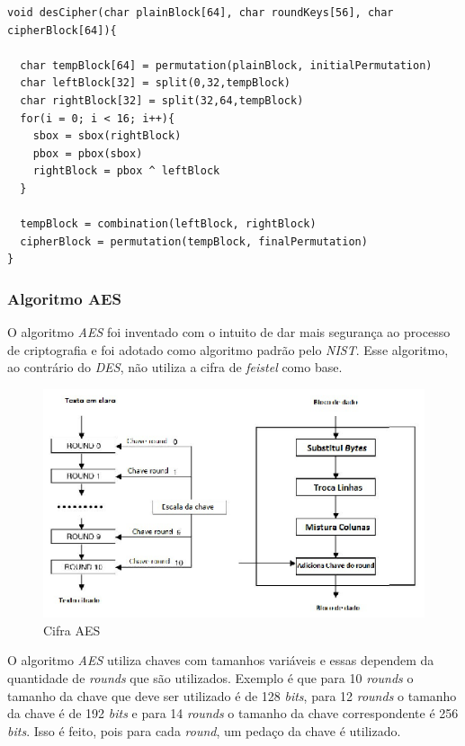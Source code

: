     \begin{lstlisting}[caption={Pseudo-código DES}, label=des-pseudo-code]
void desCipher(char plainBlock[64], char roundKeys[56], char cipherBlock[64]){

  char tempBlock[64] = permutation(plainBlock, initialPermutation)
  char leftBlock[32] = split(0,32,tempBlock)
  char rightBlock[32] = split(32,64,tempBlock)
  for(i = 0; i < 16; i++){
	sbox = sbox(rightBlock)  
	pbox = pbox(sbox)
	rightBlock = pbox ^ leftBlock
  }
  
  tempBlock = combination(leftBlock, rightBlock)
  cipherBlock = permutation(tempBlock, finalPermutation)
}
    \end{lstlisting}


\subsubsection{Algoritmo AES}

O algoritmo \textit{AES} foi inventado com o intuito de dar mais segurança ao processo de criptografia e foi adotado como algoritmo padrão pelo \textit{NIST}. Esse algoritmo, ao contrário do \textit{DES}, não utiliza a cifra de \textit{feistel} como base. 

\begin{figure}[h]
	\centering
	\includegraphics[scale=2]
		{figuras/aes_cipher.eps}
		\caption[Cifra\textit{AES}]{Cifra AES\protect\footnotemark} 
		\label{cifra-aes}
\end{figure}

O algoritmo \textit{AES} utiliza chaves com tamanhos variáveis e essas dependem da quantidade de \textit{rounds} que são utilizados. Exemplo é que para 10 \textit{rounds} o tamanho da chave que deve ser utilizado é de 128 \textit{bits}, para 12 \textit{rounds} o tamanho da chave é de 192 \textit{bits} e para 14 \textit{rounds} o tamanho da chave correspondente é 256 \textit{bits}. Isso é feito, pois para cada \textit{round}, um pedaço da chave é utilizado.

